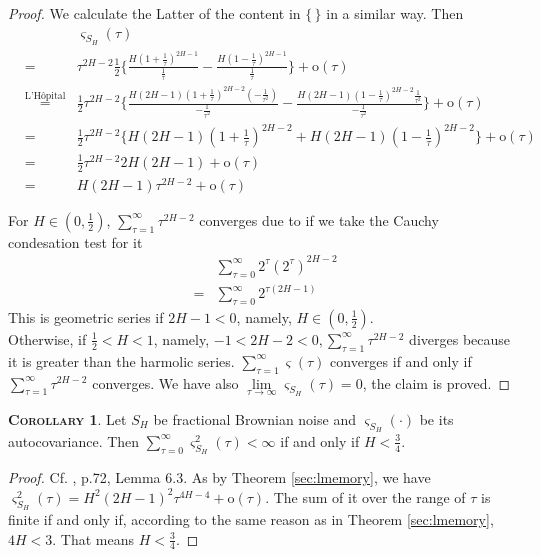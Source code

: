 \documentclass[a4paper, twoside, 11pt]{article}
\theoremstyle{definition}
\newtheorem{corollary}[definition]{\scshape Corollary}
\begin{document}
\begin{proof}
We calculate the Latter of the content in $\{\,\}$ in a similar way. Then
\begin{eqnarray*}
  &&\varsigma_{S_H}(\tau)\\
&=& \tau^{2H-2} \frac{1}{2}\{ \frac{H(1 +\frac{1}{\tau})^{2H-1}}{\frac{1}{\tau}} - \frac{H(1-\frac{1}{\tau})^{2H-1}}{\frac{1}{\tau}}\}+ \mathrm{o}(\tau)\\
&\overset{\text{L'H\^opital}}{=}& \frac{1}{2} \tau^{2H-2}\{\frac{H(2H-1)(1+\frac{1}{\tau})^{2H-2}(-\frac{1}{\tau^2})}{-\frac{1}{\tau^2}} - \frac{H(2H-1)(1-\frac{1}{\tau})^{2H-2}\frac{1}{\tau^2}}{-\frac{1}{\tau^2}}\}+ \mathrm{o}(\tau)\\
&=& \frac{1}{2} \tau^{2H-2}\{H(2H-1)(1+\frac{1}{\tau})^{2H-2} + H(2H-1)(1-\frac{1}{\tau})^{2H-2}\}+ \mathrm{o}(\tau)\\
&=& \frac{1}{2} \tau^{2H-2} 2H(2H-1)+ \mathrm{o}(\tau)\\
&=& H(2H-1) \tau^{2H-2}+ \mathrm{o}(\tau)
\end{eqnarray*}



For $H \in (0, \frac{1}{2})$, $\sum\limits_{\tau=1}^{\infty} \tau^{2H-2}$ converges due to if we take the Cauchy condesation test for it
 \begin{eqnarray*}
&& \sum_{\tau=0}^{\infty} 2^{\tau} (2^\tau)^{2H-2} \\
&=& \sum_{\tau=0}^{\infty} 2^{\tau(2H-1)}
\end{eqnarray*}
This is geometric series if $2H-1<0$, namely, $H\in(0,\frac{1}{2})$.  \\
Otherwise, if $\frac{1}{2} < H < 1$, namely, $-1<2H-2<0, \sum\limits_{\tau=1}^{\infty} \tau^{2H-2} $ diverges because it is greater than the harmolic series. $\sum\limits_{\tau=1}^{\infty} \varsigma(\tau)$ converges if and only if $\sum\limits_{\tau=1}^{\infty} \tau^{2H-2} $ converges.  We have also $\lim\limits_{\tau\rightarrow \infty}\varsigma_{S_H}(\tau)=0$, the claim is proved. 
\end{proof}

\begin{corollary}
  Let $S_H$ be fractional Brownian noise and $\varsigma_{S_H}(\cdot)$ be its autocovariance. Then $\sum_{\tau=0}^{\infty}\varsigma^2_{S_H}(\tau)<\infty$ if and only if $H < \frac{3}{4}$.
\end{corollary}
\begin{proof}
  Cf. \cite{nourdin}, p.72, Lemma 6.3. As by Theorem \ref{sec:lmemory}, we have $\varsigma_{S_H}^2(\tau) = H^2(2H-1)^2\tau^{4H-4} + \mathrm{o}(\tau) $. The sum of it over the range of $\tau$ is finite if and only if, according to the same reason as in Theorem \ref{sec:lmemory}, $4H<3$. That means $H < \frac{3}{4}$.
\end{proof}
\end{document}
